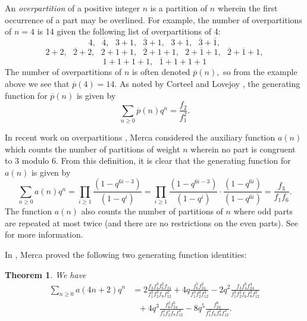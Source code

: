 \documentclass{amsart}
\newcommand{\seqnum}[1]{\href{https://oeis.org/#1}{\rm \underline{#1}}}
\newtheorem{theorem}{Theorem}[section]
\begin{document}
An {\it overpartition} of a positive integer $n$ is a partition of $n$ wherein the first occurrence of a part may be overlined.  
For example, the number of overpartitions of $n=4$ is 14 given the following list of overpartitions of 4:  
$$
4, \ \ \ \overline{4}, \ \ \ 3+1, \ \ \ \overline{3}+1, \ \ \ 3+\overline{1}, \ \ \ \overline{3}+\overline{1}, 
$$
$$
2+2, \ \ \  \overline{2} + 2, \ \ \ 2+1+1, \ \ \  \overline{2}+1+1, \ \ \  2+\overline{1}+1, \ \ \  \overline{2}+\overline{1}+1, 
$$
$$
1+1+1+1, \ \ \ \overline{1}+1+1+1
$$
The number of overpartitions of $n$ is often denoted $\overline{p}(n),$ so from the example above we see that $\overline{p}(4) = 14.$  
As noted by Corteel and Lovejoy \cite{CL}, the generating function for $\overline{p}(n)$ is given by 
\begin{equation*}
\sum_{n\geq 0} \overline{p}(n)q^n = \frac{f_2}{f_1^{2}}.
\end{equation*}


In recent work on overpartitions \cite{MercaAM}, Merca considered the auxiliary function $a(n)$ which counts the number of partitions of weight $n$ wherein no part is congruent to 3 modulo 6.  From this definition, it is clear that the generating function for $a(n)$ is given by 
\begin{equation}
\label{genfn_a}
\sum_{n\geq 0} a(n)q^n 
=
\prod_{i\geq 1} \frac{(1-q^{6i-3})}{(1-q^i)} 
= 
\prod_{i\geq 1} \frac{(1-q^{6i-3})}{(1-q^i)} \cdot \frac{(1-q^{6i})}{(1-q^{6i})} 
= 
\frac{f_3}{f_1f_6}.
\end{equation}
The function $a(n)$ also counts the number of partitions of $n$ where odd parts are repeated at most twice (and there are no restrictions on the even parts).  
See \cite[\seqnum{A131945}]{OEIS} for more information.  

In \cite{MercaAM}, Merca proved the following two generating function identities:  

\begin{theorem} We have
\label{Merca_id1}
\begin{align*}
\sum_{n\geq 0} a(4n+2)q^n 
&= 2\frac{f_3f_4^3f_6^2f_{24}}{f_1^2f_2^3f_8f_{12}^2} + 4q\frac{f_6^5f_{24}^2}{f_1^3f_2^2f_{12}^3} - 2q^2\frac{f_3f_4^3f_{24}^4}{f_1^2f_2^2f_6f_8^2f_{12}^2} \\
&\ \ \ + 4q^3\frac{f_6^2f_{24}^5}{f_1^3f_2^5f_8f_{12}^3} -8q^5\frac{f_{24}^8}{f_1^3f_6f_8^2f_{12}^3}.
\end{align*}
\end{theorem}
\end{document}
